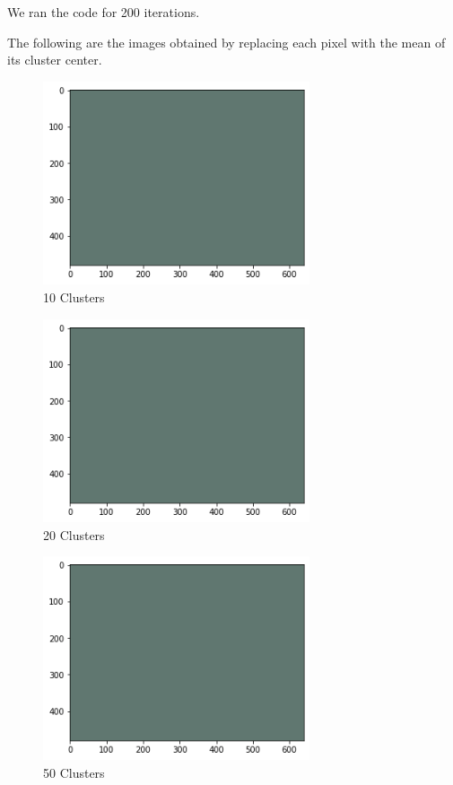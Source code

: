 \documentclass{article}      %
\begin{document}
We ran the code for 200 iterations. 

The following are the images obtained by replacing each pixel with the mean of its cluster center.     

   
\begin{figure}[H]
\centering
\includegraphics[width=0.7\textwidth]{fish_parta_means_10}
\caption{10 Clusters}
\end{figure}

   
\begin{figure}[H]
\centering
\includegraphics[width=0.7\textwidth]{fish_parta_means_20}
\caption{20 Clusters}
\end{figure}

    
\begin{figure}[H]
\centering
\includegraphics[width=0.7\textwidth]{fish_parta_means_50}
\caption{50 Clusters}
\end{figure}
\end{document}
